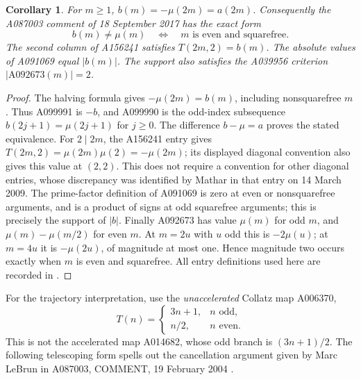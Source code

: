 \documentclass[11pt]{article}
\newtheorem{corollary}[theorem]{Corollary}
\begin{document}
\begin{corollary}\label{cor:nearby}
For $m\geq1$, $b(m)=-\mu(2m)=a(2m)$. Consequently the A087003
comment of 18 September 2017 has the exact form
\[
 b(m)\ne\mu(m)\quad\Longleftrightarrow\quad
 m\text{ is even and squarefree}.
\]
The second column of A156241 satisfies $T(2m,2)=b(m)$.
The absolute values of A091069 equal $|b(m)|$.
The support also satisfies the A039956 criterion
$|\mathrm{A092673}(m)|=2$.
\end{corollary}
\begin{proof}
The halving formula gives $-\mu(2m)=b(m)$, including nonsquarefree $m$.
Thus A099991 is $-b$, and A099990 is the odd-index subsequence
$b(2j+1)=\mu(2j+1)$ for $j\geq0$.
The difference $b-\mu=a$ proves the stated equivalence.
For $2\mid 2m$, the A156241 entry gives
$T(2m,2)=\mu(2m)\mu(2)=-\mu(2m)$; its displayed diagonal convention
also gives this value at $(2,2)$. This does not require a convention for
other diagonal entries, whose discrepancy was identified by Mathar in
that entry on 14 March 2009.
The prime-factor definition of A091069 is zero at even or nonsquarefree
arguments, and is a product of signs at odd squarefree arguments;
this is precisely the support of $|b|$.
Finally A092673 has value $\mu(m)$ for odd $m$, and
$\mu(m)-\mu(m/2)$ for even $m$. At $m=2u$ with $u$ odd this is
$-2\mu(u)$; at $m=4u$ it is $-\mu(2u)$, of magnitude at most one.
Hence magnitude two occurs exactly when $m$ is even and squarefree.
All entry definitions used here are recorded in \cite{nearby}.
\end{proof}

For the trajectory interpretation, use the \emph{unaccelerated} Collatz
map A006370,
\[
 T(n)=\begin{cases}3n+1,&n\text{ odd},\\n/2,&n\text{ even}.
 \end{cases}
\]
This is not the accelerated map A014682, whose odd branch is
$(3n+1)/2$. The following telescoping form spells out the cancellation
argument given by Marc LeBrun in A087003, COMMENT, 19 February 2004
\cite{companion}.
\end{document}
